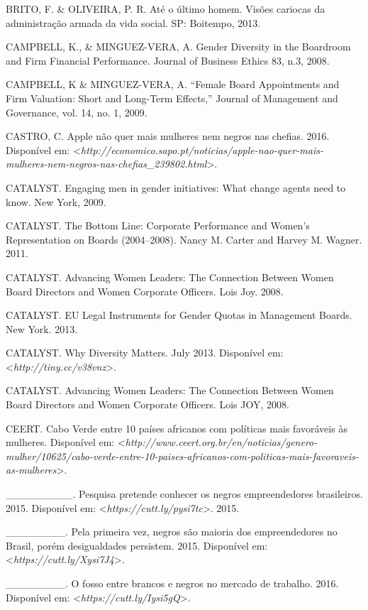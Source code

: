 \begin{Parskip}
BRITO, F. \& OLIVEIRA, P. R. Até o último homem. Visões cariocas da
administração armada da vida social. SP: Boitempo, 2013.

CAMPBELL, K., \& MINGUEZ-VERA, A. Gender Diversity in the Boardroom and
Firm Financial Performance. Journal of Business Ethics 83, n.3, 2008.

CAMPBELL, K \& MINGUEZ-VERA, A. ``Female Board Appointments and Firm
Valuation: Short and Long-Term Effects,'' Journal of Management and
Governance, vol. 14, no. 1, 2009.

CASTRO, C. Apple não quer mais mulheres nem negros nas chefias. 2016.
Disponível em: \textless{}\emph{http://economico.sapo.pt/noticias/apple-nao-quer-mais-mulheres-nem-negros-nas-chefias\_239802.html}\textgreater{}.

CATALYST. Engaging men in gender initiatives: What change agents need to
know. New York, 2009.

CATALYST. The Bottom Line: Corporate Performance and Women's
Representation on Boards (2004--2008). Nancy M. Carter and Harvey M.
Wagner. 2011.

CATALYST. Advancing Women Leaders: The Connection Between Women Board
Directors and Women Corporate Officers. Lois Joy. 2008.

CATALYST. EU Legal Instruments for Gender Quotas in Management Boards.
New York. 2013.

CATALYST. Why Diversity Matters. July 2013.
Disponível em: \textless{}\emph{http://tiny.cc/v38vnz}\textgreater{}.

CATALYST. Advancing Women Leaders: The Connection Between Women Board
Directors and Women Corporate Officers. Lois JOY, 2008.

CEERT. Cabo Verde entre 10 países africanos com políticas mais
favoráveis às mulheres.
Disponível em: \textless{}\emph{http://www.ceert.org.br/en/noticias/genero-mulher/10625/cabo-verde-entre-10-paises-africanos-com-politicas-mais-favoraveis-as-mulheres}\textgreater{}.

\_\_\_\_\_\_\_\_\_. Pesquisa pretende conhecer os negros empreendedores
brasileiros. 2015.
Disponível em: \textless{}\emph{https://cutt.ly/pysi7tc}\textgreater{}.
2015.

\_\_\_\_\_\_\_\_. Pela primeira vez, negros são maioria dos
empreendedores no Brasil, porém desigualdades persistem. 2015.
Disponível em: \textless{}\emph{https://cutt.ly/Xysi7J4}\textgreater{}.

\_\_\_\_\_\_\_\_. O fosso entre brancos e negros no mercado de trabalho.
2016.
Disponível em: \textless{}\emph{https://cutt.ly/Iysi5gQ}\textgreater{}.


\end{Parskip}
